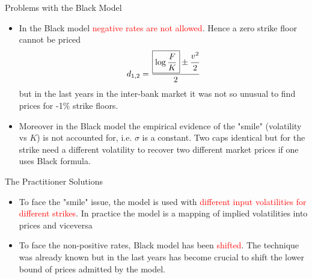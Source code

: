 \documentclass{beamer}
\begin{document}
\begin{frame}{Problems with the Black Model}
\begin{itemize}
	\item In the Black model \textcolor{red}{negative rates are not allowed}. Hence a zero strike floor cannot be priced
	\begin{equation*}
		d_{1,2} = \frac{\boxed{\log{\frac{F}{K}}} \pm \cfrac{v^2}{2}}{2} 
	\end{equation*}
	but in the last years in the inter-bank market it was not so unusual to find prices for -1\% strike floors.
	\item Moreover in the Black model the empirical evidence of the "smile" (volatility vs $K$) is not accounted for, i.e. $\sigma$ is a constant. Two caps identical but for the strike need a different volatility to recover two different market prices if one uses Black formula.
\end{itemize}
\end{frame}

\begin{frame}{The Practitioner Solutions}
\begin{itemize}
	\item To face the "smile" issue, the model is used with \textcolor{red}{different input volatilities for different strikes}. In practice the model is a mapping of implied volatilities into prices and viceversa%
	\item To face the non-positive rates, Black model has been \textcolor{red}{shifted}. The technique was already known but in the last years has become crucial to shift the lower bound of prices admitted by the model.
\end{itemize}
\end{frame}
\end{document}
